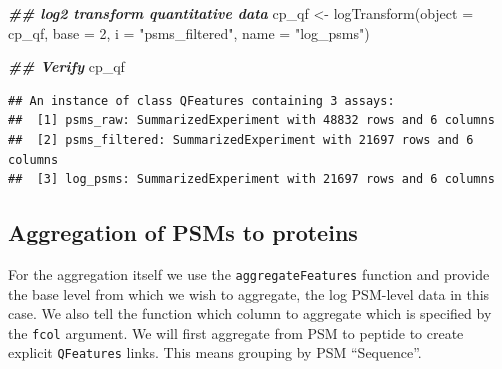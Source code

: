\documentclass[9pt,a4paper,]{extarticle}
\newenvironment{Shaded}{\begin{snugshade}}{\end{snugshade}}
\newcommand{\AttributeTok}[1]{\textcolor[rgb]{0.77,0.63,0.00}{#1}}
\newcommand{\DecValTok}[1]{\textcolor[rgb]{0.00,0.00,0.81}{#1}}
\newcommand{\DocumentationTok}[1]{\textcolor[rgb]{0.56,0.35,0.01}{\textbf{\textit{#1}}}}
\newcommand{\FunctionTok}[1]{\textcolor[rgb]{0.00,0.00,0.00}{#1}}
\newcommand{\NormalTok}[1]{#1}
\newcommand{\OtherTok}[1]{\textcolor[rgb]{0.56,0.35,0.01}{#1}}
\newcommand{\StringTok}[1]{\textcolor[rgb]{0.31,0.60,0.02}{#1}}
\begin{document}
\begin{Shaded}
\begin{Highlighting}[]
\DocumentationTok{\#\# log2 transform quantitative data}
\NormalTok{cp\_qf }\OtherTok{\textless{}{-}} \FunctionTok{logTransform}\NormalTok{(}\AttributeTok{object =}\NormalTok{ cp\_qf,}
                      \AttributeTok{base =} \DecValTok{2}\NormalTok{,}
                      \AttributeTok{i =} \StringTok{"psms\_filtered"}\NormalTok{,}
                      \AttributeTok{name =} \StringTok{"log\_psms"}\NormalTok{)}

\DocumentationTok{\#\# Verify}
\NormalTok{cp\_qf}
\end{Highlighting}
\end{Shaded}

\begin{verbatim}
## An instance of class QFeatures containing 3 assays:
##  [1] psms_raw: SummarizedExperiment with 48832 rows and 6 columns 
##  [2] psms_filtered: SummarizedExperiment with 21697 rows and 6 columns 
##  [3] log_psms: SummarizedExperiment with 21697 rows and 6 columns
\end{verbatim}

\hypertarget{aggregation-of-psms-to-proteins}{%
\subsection{Aggregation of PSMs to proteins}\label{aggregation-of-psms-to-proteins}}

For the aggregation itself we use the \texttt{aggregateFeatures} function and provide
the base level from which we wish to aggregate, the log PSM-level data in this
case. We also tell the function which column to aggregate which is specified by
the \texttt{fcol} argument. We will first aggregate from PSM to peptide to create
explicit \texttt{QFeatures} links. This means grouping by PSM ``Sequence''.
\end{document}
